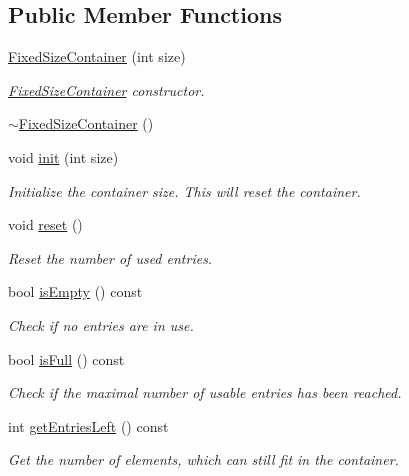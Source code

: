 \subsection*{Public Member Functions}
\begin{DoxyCompactItemize}
\item 
\mbox{\hyperlink{classr3_1_1_fixed_size_container_a9396266faf0a5d5d75ea50f0d74d5267}{Fixed\+Size\+Container}} (int size)
\begin{DoxyCompactList}\small\item\em \mbox{\hyperlink{classr3_1_1_fixed_size_container}{Fixed\+Size\+Container}} constructor. \end{DoxyCompactList}\item 
\mbox{\hyperlink{classr3_1_1_fixed_size_container_af235a796be8de5a9e96c788b676b59fa}{$\sim$\+Fixed\+Size\+Container}} ()
\item 
void \mbox{\hyperlink{classr3_1_1_fixed_size_container_a75dddd29ba901e97ba6133a6c388b357}{init}} (int size)
\begin{DoxyCompactList}\small\item\em Initialize the container size. This will reset the container. \end{DoxyCompactList}\item 
void \mbox{\hyperlink{classr3_1_1_fixed_size_container_a56aa3725cacf135fc1eacddbf424c868}{reset}} ()
\begin{DoxyCompactList}\small\item\em Reset the number of used entries. \end{DoxyCompactList}\item 
bool \mbox{\hyperlink{classr3_1_1_fixed_size_container_adde8deee5146abd862ef32e1ac3bb879}{is\+Empty}} () const
\begin{DoxyCompactList}\small\item\em Check if no entries are in use. \end{DoxyCompactList}\item 
bool \mbox{\hyperlink{classr3_1_1_fixed_size_container_ae3beb2a45a67d3bd4f6cb32f39805889}{is\+Full}} () const
\begin{DoxyCompactList}\small\item\em Check if the maximal number of usable entries has been reached. \end{DoxyCompactList}\item 
int \mbox{\hyperlink{classr3_1_1_fixed_size_container_a5d21f93fcf7117df372d321c0d9102fa}{get\+Entries\+Left}} () const
\begin{DoxyCompactList}\small\item\em Get the number of elements, which can still fit in the container. \end{DoxyCompactList}\item 

\end{DoxyCompactItemize}

